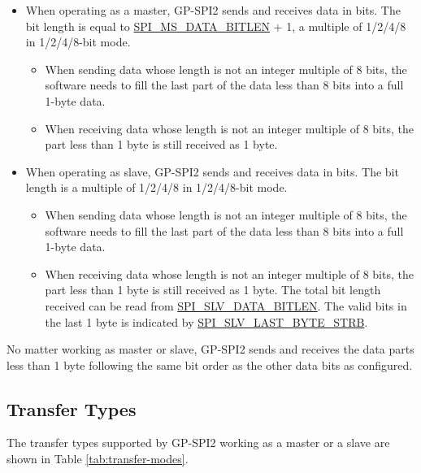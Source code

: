 \documentclass[main\_\_EN.tex]{subfiles}
\begin{document}
\begin{itemize}
    \item When operating as a master, GP-SPI2 sends and receives data in bits. The bit length is equal to \hyperref[fielddesc:SPIMSDATABITLEN]{SPI\_MS\_DATA\_BITLEN} + 1, a multiple of 1/2/4/8 in 1/2/4/8-bit mode.
    \begin{itemize}
        \item When sending data whose length is not an integer multiple of 8 bits, the software needs to fill the last part of the data less than 8 bits into a full 1-byte data.
        \item When receiving data whose length is not an integer multiple of 8 bits, the part less than 1 byte is still received as 1 byte.
    \end{itemize}
    \item When operating as slave, GP-SPI2 sends and receives data in bits. The bit length is a multiple of 1/2/4/8 in 1/2/4/8-bit mode.
    \begin{itemize}
        \item When sending data whose length is not an integer multiple of 8 bits, the software needs to fill the last part of the data less than 8 bits into a full 1-byte data.
        \item When receiving data whose length is not an integer multiple of 8 bits, the part less than 1 byte is still received as 1 byte. The total bit length received can be read from \hyperref[fielddesc:SPISLVDATABITLEN]{SPI\_SLV\_DATA\_BITLEN}. The valid bits in the last 1 byte is indicated by \hyperref[fielddesc:SPISLVLASTBYTESTRB]{SPI\_SLV\_LAST\_BYTE\_STRB}.
    \end{itemize}
\end{itemize}

\begin{tiplisting}
No matter working as master or slave, GP-SPI2 sends and receives the data parts less than 1 byte following the same bit order as the other data bits as configured.
\end{tiplisting}

\subsection{Transfer Types}

The transfer types supported by GP-SPI2 working as a master or a slave are shown in Table \ref{tab:transfer-modes}.
\end{document}
